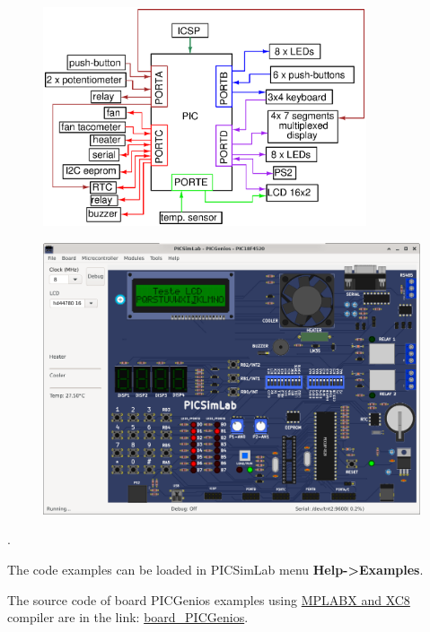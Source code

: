 \begin{figure}[H]
\center
\includegraphics[width=0.85\textwidth]{img/blocks_p4.eps} 
\end{figure} 


\begin{figure}[H]
\center
\includegraphics[width=0.99\textwidth]{img/picsimlab4.png} 
\end{figure} 

.\vspace{0.5cm}

The code examples can be loaded in PICSimLab menu \textbf{Help->Examples}.

The source code of board PICGenios examples using 
\href{http://www.microchip.com/mplabx}{MPLABX and XC8} compiler are in the link: 
\href{https://lcgamboa.github.io/picsimlab_examples/board_PICGenios.html}{board\_PICGenios}.


